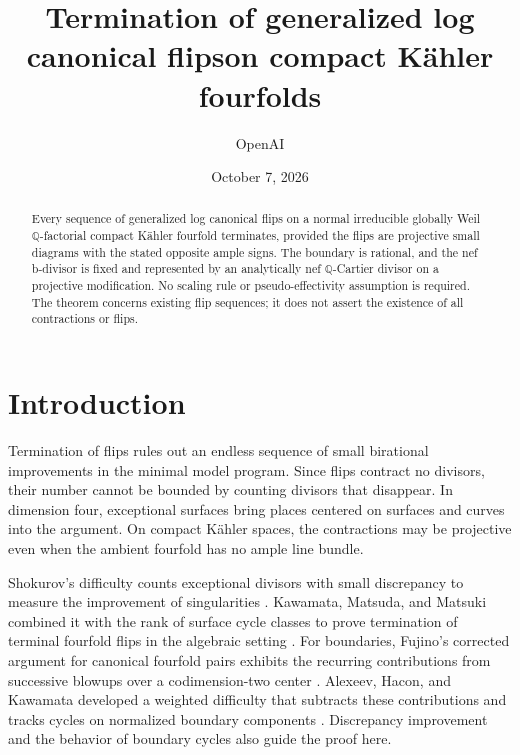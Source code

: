 \documentclass[11pt]{amsart}
\title[Generalized log canonical flips on K\"ahler fourfolds]{Termination of generalized log canonical flips\newline on compact K\"ahler fourfolds}
\author{OpenAI}
\date{October 7, 2026}
\theoremstyle{definition}
\theoremstyle{remark}
\numberwithin{equation}{section}
\newcommand{\Q}{\mathbb{Q}}
\begin{document}
\begin{abstract}
Every sequence of generalized log canonical flips on a normal irreducible globally Weil \(\Q\)-factorial compact K\"ahler fourfold terminates, provided the flips are projective small diagrams with the stated opposite ample signs. The boundary is rational, and the nef b-divisor is fixed and represented by an analytically nef \(\Q\)-Cartier divisor on a projective modification. No scaling rule or pseudo-effectivity assumption is required. The theorem concerns existing flip sequences; it does not assert the existence of all contractions or flips.

\end{abstract}
\maketitle
\tableofcontents

\section{Introduction}\label{sec:introduction}

Termination of flips rules out an endless sequence of small birational improvements in the minimal model program. Since flips contract no divisors, their number cannot be bounded by counting divisors that disappear. In dimension four, exceptional surfaces bring places centered on surfaces and curves into the argument. On compact K\"ahler spaces, the contractions may be projective even when the ambient fourfold has no ample line bundle.

Shokurov's difficulty counts exceptional divisors with small discrepancy to measure the improvement of singularities \cite[Definition~2.15 and Corollaries~2.16--2.17]{ShokurovNonvanishing}. Kawamata, Matsuda, and Matsuki combined it with the rank of surface cycle classes to prove termination of terminal fourfold flips in the algebraic setting \cite[Theorem~5-1-15]{KawamataMatsudaMatsuki1987}. For boundaries, Fujino's corrected argument for canonical fourfold pairs exhibits the recurring contributions from successive blowups over a codimension-two center \cite[Example~2.1 and Theorems~5.1--5.2]{Fujino2005Addendum}. Alexeev, Hacon, and Kawamata developed a weighted difficulty that subtracts these contributions and tracks cycles on normalized boundary components \cite[Section~2]{AlexeevHaconKawamata2007}. Discrepancy improvement and the behavior of boundary cycles also guide the proof here.
\end{document}
